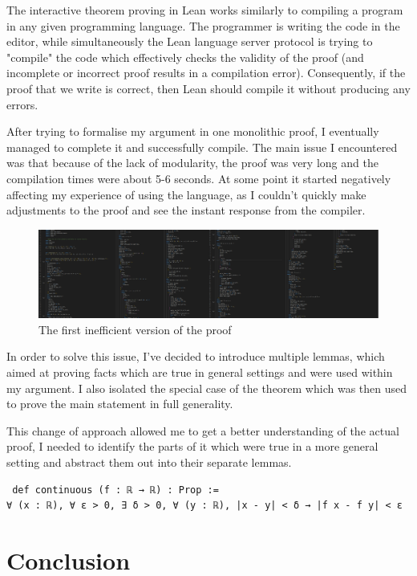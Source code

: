 \documentclass[11pt]{article}
\begin{document}
The interactive theorem proving in Lean works similarly to compiling a program
in any given programming language. The programmer is writing the code in the
editor, while simultaneously the Lean language server protocol is trying to
"compile" the code which effectively checks the validity of the proof (and
incomplete or incorrect proof results in a compilation error). Consequently, if
the proof that we write is correct, then Lean should compile it without
producing any errors.

After trying to formalise my argument in one monolithic proof, I eventually
managed to complete it and successfully compile. The main issue I
encountered was that because of the lack of modularity, the proof was very long
and the compilation times were about 5-6 seconds. At some point it started
negatively affecting my experience of using the language, as I couldn't quickly
make adjustments to the proof and see the instant response from the compiler.

\begin{figure}[H]
  \centering
  \includegraphics[scale=1.1]{long_code.png}
  \caption{The first inefficient version of the proof}
	\label{long_code}

\end{figure}

In order to solve this issue, I've decided to introduce multiple lemmas, which
aimed at proving facts which are true in general settings and were used within
my argument. I also isolated the special case of the theorem which was then
used to prove the main statement in full generality.

This change of approach allowed me to get a better understanding of the actual
proof, I needed to identify the parts of it which were true in a more general
setting and abstract them out into their separate lemmas.

\begin{verbatim}
 def continuous (f : ℝ → ℝ) : Prop :=
∀ (x : ℝ), ∀ ε > 0, ∃ δ > 0, ∀ (y : ℝ), |x - y| < δ → |f x - f y| < ε

\end{verbatim}

\section*{ Conclusion }
\end{document}
